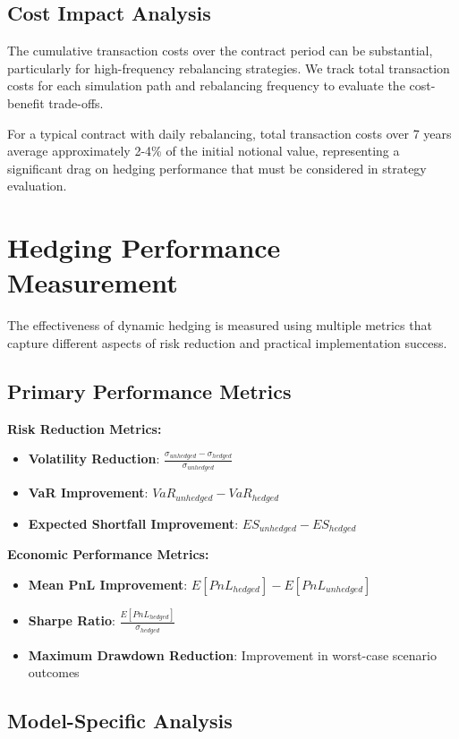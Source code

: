 \documentclass[12pt,a4paper]{report}
\begin{document}
\subsection{Cost Impact Analysis}

The cumulative transaction costs over the contract period can be substantial, particularly for high-frequency rebalancing strategies. We track total transaction costs for each simulation path and rebalancing frequency to evaluate the cost-benefit trade-offs.

For a typical contract with daily rebalancing, total transaction costs over 7 years average approximately 2-4\% of the initial notional value, representing a significant drag on hedging performance that must be considered in strategy evaluation.

\section{Hedging Performance Measurement}

The effectiveness of dynamic hedging is measured using multiple metrics that capture different aspects of risk reduction and practical implementation success.

\subsection{Primary Performance Metrics}

\textbf{Risk Reduction Metrics:}
\begin{itemize}
\item \textbf{Volatility Reduction}: $\frac{\sigma_{unhedged} - \sigma_{hedged}}{\sigma_{unhedged}}$
\item \textbf{VaR Improvement}: $VaR_{unhedged} - VaR_{hedged}$  
\item \textbf{Expected Shortfall Improvement}: $ES_{unhedged} - ES_{hedged}$
\end{itemize}

\textbf{Economic Performance Metrics:}
\begin{itemize}
\item \textbf{Mean PnL Improvement}: $E[PnL_{hedged}] - E[PnL_{unhedged}]$
\item \textbf{Sharpe Ratio}: $\frac{E[PnL_{hedged}]}{\sigma_{hedged}}$
\item \textbf{Maximum Drawdown Reduction}: Improvement in worst-case scenario outcomes
\end{itemize}

\subsection{Model-Specific Analysis}
\end{document}
